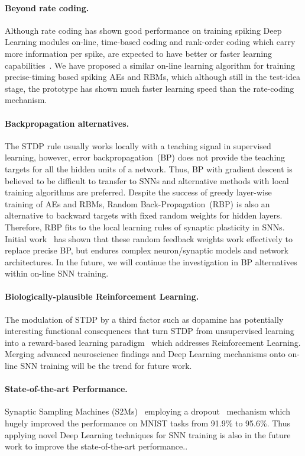 \paragraph{Beyond rate coding.}
Although rate coding has shown good performance on training spiking Deep Learning modules on-line, time-based coding and rank-order coding which carry more information per spike, are expected to have better or faster learning capabilities~\citep{gautrais1998rate}.
We have proposed a similar on-line learning algorithm for training precise-timing based spiking AEs and RBMs, which although still in the test-idea stage, \DIFaddbegin {}\DIFaddend the prototype has shown much faster learning speed than the rate-coding mechanism.

\paragraph{Backpropagation alternatives.}
The STDP rule usually works locally with a teaching signal in supervised learning, however, error backpropagation~(BP) does not provide the teaching targets for all the hidden units of a network.
Thus, BP with gradient descent is believed to be difficult to transfer to SNNs and alternative methods with local training algorithms are preferred.
Despite the success of greedy layer-wise training of AEs and RBMs, Random Back-Propagation~(RBP) is also an alternative to backward targets with fixed random weights for hidden layers.
Therefore, RBP fits to the local learning rules of synaptic plasticity in SNNs.
Initial work~\citep{samadi2017deep,neftci2017event} has shown that these random feedback weights work effectively to replace precise BP, but endures complex neuron/synaptic models and network architectures.
In the future, we will continue the investigation in BP alternatives within on-line SNN training.

\paragraph{Biologically-plausible Reinforcement Learning.}
The modulation of STDP by a third factor such as dopamine has potentially interesting functional consequences that turn STDP from unsupervised learning into a reward-based learning paradigm~\citep{izhikevich2007solving} which addresses Reinforcement Learning.
Merging advanced neuroscience findings and Deep Learning mechanisms onto on-line SNN training will be the trend for future work.


\paragraph{State-of-the-art Performance.}
Synaptic Sampling Machines (S2Ms)~\citep{neftci2016stochastic} employing a dropout~\citep{srivastava2014dropout} mechanism which hugely improved the performance on MNIST tasks from 91.9\% to 95.6\%.
Thus applying novel Deep Learning techniques for SNN training is also in the future work to improve the state-of-the-art performance..

